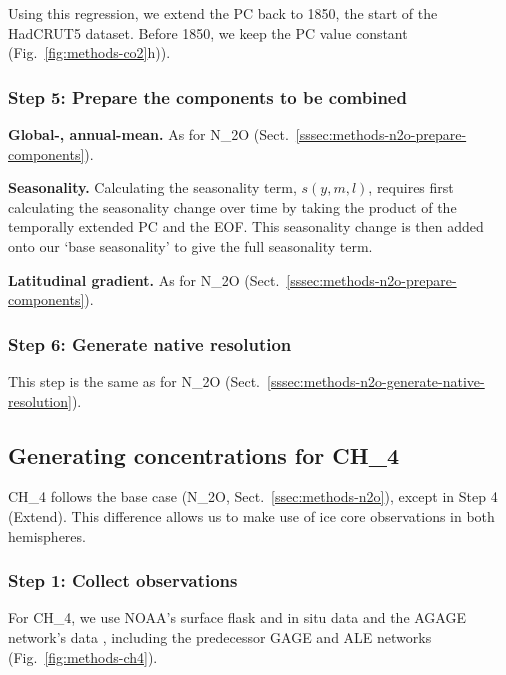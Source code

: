 Using this regression, we extend the PC back to 1850,
the start of the HadCRUT5 dataset.
Before 1850, we keep the PC value constant (Fig.~\ref{fig:methods-co2}h)).

\subsubsection{Step 5: Prepare the components to be combined}
\label{sssec:methods-co2-prepare-components}

\textbf{Global-, annual-mean.}
As for N_2O (Sect.~\ref{sssec:methods-n2o-prepare-components}).

\textbf{Seasonality.}
Calculating the seasonality term, $s(y, m, l)$, requires first calculating the seasonality change over time
by taking the product of the temporally extended PC and the EOF.
This seasonality change is then added onto our `base seasonality' to give the full seasonality term.

\textbf{Latitudinal gradient.}
As for N_2O (Sect.~\ref{sssec:methods-n2o-prepare-components}).

\subsubsection{Step 6: Generate native resolution}
\label{sssec:methods-co2-generate-native-resolution}

This step is the same as for N_2O (Sect.~\ref{sssec:methods-n2o-generate-native-resolution}).

\subsection{Generating concentrations for CH_4}
\label{ssec:methods-ch4}

CH_4 follows the base case (N_2O, Sect.~\ref{ssec:methods-n2o}),
except in Step 4 (Extend).
This difference allows us to make use of ice core observations in both hemispheres.

\subsubsection{Step 1: Collect observations}
\label{sssec:methods-ch4-collect-observations}

For CH_4, we use NOAA's surface flask \citep{lan_ch4-flask_2024} and in situ \citep{thoning_ch4-in-situ_2024} data
and the AGAGE network's data \citep{prinn_ale-gage-agage_2000,prinn_agage_2018}, including the predecessor GAGE and ALE networks \citep{prinn_ale-gage-agage_2000} (Fig.~\ref{fig:methods-ch4}).


